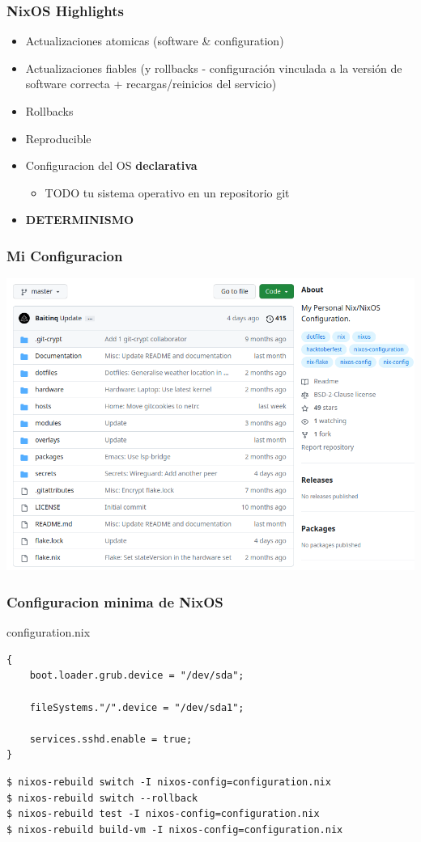 \documentclass[aspectratio=43]{beamer}
\begin{document}
\begin{frame}
    \frametitle{NixOS Highlights}

    \begin{itemize}
\item Actualizaciones atomicas (software & configuration)
\item Actualizaciones fiables (y rollbacks - configuración vinculada a la versión de software correcta + recargas/reinicios del servicio)
\item Rollbacks
\item Reproducible
\item Configuracion del OS \textbf{declarativa}
\begin{itemize}
\item TODO tu sistema operativo en un repositorio git
\end{itemize}
\item \textbf{DETERMINISMO}
    \end{itemize}
\end{frame}

\begin{frame}
\frametitle{Mi Configuracion}
    \includegraphics[scale=0.34]{img/20230413_10h27m54s_grim.png}
\end{frame}

\begin{frame}[fragile]
\frametitle{Configuracion minima de NixOS}
\begin{block}{configuration.nix}
\begin{verbatim}
{
    boot.loader.grub.device = "/dev/sda";

    fileSystems."/".device = "/dev/sda1";

    services.sshd.enable = true;
}
\end{verbatim}
\end{block}
\begin{block}{}
\begin{verbatim}
$ nixos-rebuild switch -I nixos-config=configuration.nix
$ nixos-rebuild switch --rollback
$ nixos-rebuild test -I nixos-config=configuration.nix
$ nixos-rebuild build-vm -I nixos-config=configuration.nix
\end{verbatim}
\end{block}
\end{frame}
\end{document}
